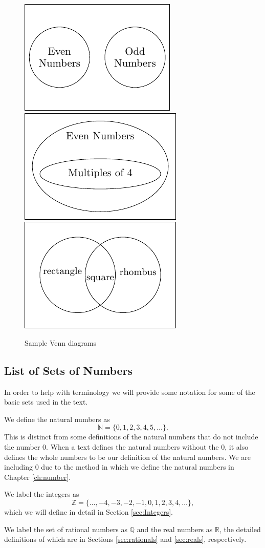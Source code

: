 \documentclass[
]{book}
\theoremstyle{definition}
\theoremstyle{definition}
\theoremstyle{definition}
\theoremstyle{definition}
\theoremstyle{remark}
\begin{document}
\begin{figure}

{\centering \includegraphics[width=0.3\linewidth]{tikz/evenodd} \includegraphics[width=0.3\linewidth]{tikz/evenfours} \includegraphics[width=0.3\linewidth]{tikz/rectsqrhombus} 

}

\caption{Sample Venn diagrams}\label{fig:venn-samples}
\end{figure}

\hypertarget{list-of-sets-of-numbers}{%
\subsection{List of Sets of Numbers}\label{list-of-sets-of-numbers}}

In order to help with terminology we will provide some notation for some of the basic sets used in the text.

We define the natural numbers as
\[\mathbb{N}=\{0,1,2,3,4,5,\ldots\}.\]
This is distinct from some definitions of the natural numbers that do not include the number \(0\). When a text defines the natural numbers without the \(0\), it also defines the whole numbers to be our definition of the natural numbers. We are including \(0\) due to the method in which we define the natural numbers in Chapter \ref{ch:number}.

We label the integers as \[\mathbb{Z} = \{\ldots, -4, -3, -2, -1, 0, 1, 2, 3, 4, \ldots\},\] which we will define in detail in Section \ref{sec:Integers}.

We label the set of rational numbers as \(\mathbb{Q}\) and the real numbers as \(\mathbb{R}\), the detailed definitions of which are in Sections \ref{sec:rationals} and \ref{sec:reals}, respectively.
\end{document}
